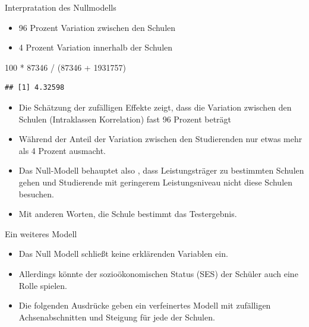 \documentclass[ignorenonframetext,]{beamer}
\newenvironment{Shaded}{}{}
\newcommand{\DecValTok}[1]{\textcolor[rgb]{0.25,0.63,0.44}{{#1}}}
\newcommand{\StringTok}[1]{\textcolor[rgb]{0.25,0.44,0.63}{{#1}}}
\newcommand{\NormalTok}[1]{{#1}}
\providecommand{\tightlist}{%
\setlength{\itemsep}{0pt}\setlength{\parskip}{0pt}}
\begin{document}
\begin{frame}[fragile]{Interpratation des Nullmodells}

\begin{itemize}
\tightlist
\item
  96 Prozent Variation zwischen den Schulen
\item
  4 Prozent Variation innerhalb der Schulen
\end{itemize}

\begin{Shaded}
\begin{Highlighting}[]
\DecValTok{100} \NormalTok{*}\StringTok{ }\DecValTok{87346} \NormalTok{/}\StringTok{ }\NormalTok{(}\DecValTok{87346} \NormalTok{+}\StringTok{ }\DecValTok{1931757}\NormalTok{)}
\end{Highlighting}
\end{Shaded}

\begin{verbatim}
## [1] 4.32598
\end{verbatim}

\begin{itemize}
\item
  Die Schätzung der zufälligen Effekte zeigt, dass die Variation
  zwischen den Schulen (Intraklassen Korrelation) fast 96 Prozent
  beträgt
\item
  Während der Anteil der Variation zwischen den Studierenden nur etwas
  mehr als 4 Prozent ausmacht.
\item
  Das Null-Modell behauptet also , dass Leistungsträger zu bestimmten
  Schulen gehen und Studierende mit geringerem Leistungsniveau nicht
  diese Schulen besuchen.
\item
  Mit anderen Worten, die Schule bestimmt das Testergebnis.
\end{itemize}

\end{frame}

\begin{frame}{Ein weiteres Modell}

\begin{itemize}
\tightlist
\item
  Das Null Modell schließt keine erklärenden Variablen ein.
\item
  Allerdings könnte der sozioökonomischen Status (SES) der Schüler auch
  eine Rolle spielen.
\item
  Die folgenden Ausdrücke geben ein verfeinertes Modell mit zufälligen
  Achsenabschnitten und Steigung für jede der Schulen.
\end{itemize}

\end{frame}
\end{document}
